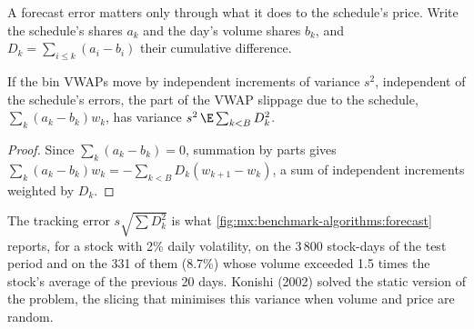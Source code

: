 \label{lst:mx:benchmark-algorithms:levelar}

A forecast error matters only through what it does to the schedule's price. Write the schedule's shares $a_k$ and the day's volume shares $b_k$, and
$D_k=\sum_{i\le k}(a_i-b_i)$ their cumulative difference.

\begin{proposition}\label{prop:mx:benchmark-algorithms:tracking}
If the bin VWAPs move by independent increments of variance $s^2$, independent of the schedule's errors, the part of the VWAP slippage due to the
schedule, $\sum_k(a_k-b_k)w_k$, has variance $s^2\,\E\sum_{k<B}D_k^2$.
\end{proposition}

\begin{proof}
Since $\sum_k(a_k-b_k)=0$, summation by parts gives $\sum_k(a_k-b_k)w_k=-\sum_{k<B}D_k(w_{k+1}-w_k)$, a sum of independent increments weighted by
$D_k$.
\end{proof}

The tracking error $s\sqrt{\sum D_k^2}$ is what \cref{fig:mx:benchmark-algorithms:forecast} reports, for a stock with 2\% daily volatility, on the 3\,800
stock-days of the test period and on the 331 of them (8.7\%) whose volume exceeded 1.5 times the stock's average of the previous 20 days. Konishi
(2002) solved the static version of the problem, the slicing that minimises this variance when volume and price are random.

